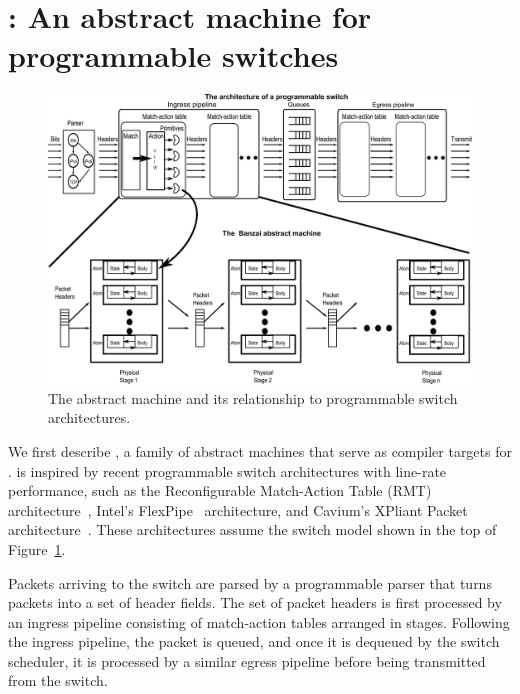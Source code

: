 \section{\absmachine: An abstract machine for programmable switches}
\label{s:absmachine}


\begin{figure}[!t]
  \includegraphics[width=\textwidth]{banzai.pdf}
  \caption{The \absmachine abstract machine and its relationship to
  programmable switch architectures.}
  \label{fig:switch}
\end{figure}

We first describe \absmachine, a family of abstract machines that serve as
compiler targets for \pktlanguage. \absmachine is inspired by recent
programmable switch architectures with line-rate performance, such as the
Reconfigurable Match-Action Table (RMT) architecture~\cite{rmt}, Intel's
FlexPipe~\cite{flexpipe} architecture, and Cavium's XPliant Packet
architecture~\cite{xpliant}. These architectures assume the switch model shown
in the top of Figure~\ref{fig:switch}.

Packets arriving to the switch are parsed by a programmable parser that turns
packets into a set of header fields. The set of packet headers is first
processed by an ingress pipeline consisting of match-action tables arranged in
stages. Following the ingress pipeline, the packet is queued, and once it is
dequeued by the switch scheduler, it is processed by a similar egress pipeline
before being transmitted from the switch.

